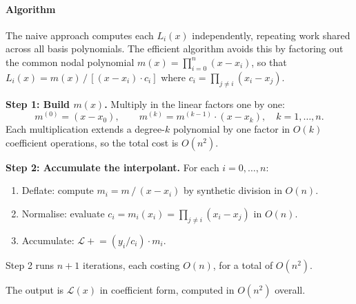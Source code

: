 \paragraph{Algorithm}

The naive approach computes each $L_i(x)$ independently, repeating work shared across all basis polynomials.
The efficient algorithm avoids this by factoring out the common nodal polynomial
\(m(x) = \prod_{i=0}^{n}(x - x_i)\),
so that \(L_i(x) = m(x)\,/\,[(x - x_i)\cdot c_i]\) where \(c_i = \prod_{j \neq i}(x_i - x_j)\).

\medskip
\noindent\textbf{Step 1: Build $m(x)$.}
Multiply in the linear factors one by one:
\[m^{(0)} = (x - x_0),\qquad m^{(k)} = m^{(k-1)}\cdot(x - x_k),\quad k=1,\dots,n.\]
Each multiplication extends a degree-$k$ polynomial by one factor in $O(k)$ coefficient operations, so the total cost is $O(n^2)$.

\medskip
\noindent\textbf{Step 2: Accumulate the interpolant.}
For each $i = 0, \dots, n$:
\begin{enumerate}
  \item Deflate: compute $m_i = m\,/\,(x - x_i)$ by synthetic division in $O(n)$.
  \item Normalise: evaluate $c_i = m_i(x_i) = \prod_{j \neq i}(x_i - x_j)$ in $O(n)$.
  \item Accumulate: $\mathcal{L} \mathrel{+}= (y_i / c_i)\cdot m_i$.
\end{enumerate}
Step 2 runs $n+1$ iterations, each costing $O(n)$, for a total of $O(n^2)$.

The output is $\mathcal{L}(x)$ in coefficient form, computed in $O(n^2)$ overall.



